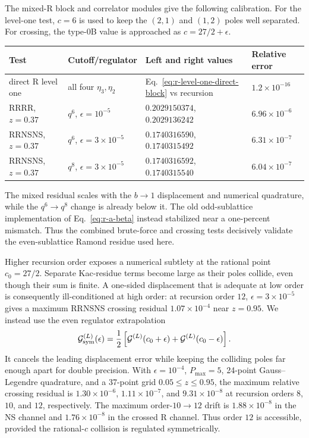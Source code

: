 \documentclass[11pt]{article}
\begin{document}
The mixed-R block and correlator modules give the following calibration.
For the level-one test, $c=6$ is used to keep the $(2,1)$ and $(1,2)$ poles
well separated.  For crossing, the type-0B value is approached as
$c=27/2+\epsilon$.
\begin{center}
\begin{tabular}{@{}llll@{}}
\toprule
Test & Cutoff/regulator & Left and right values & Relative error\\
\midrule
direct R level one
 & all four $\eta_3,\eta_2$
 & Eq.~\eqref{eq:r-level-one-direct-block} vs recursion
 & $1.2\times10^{-16}$\\
RRRR, $z=0.37$
 & $q^6$, $\epsilon=10^{-5}$
 & $0.2029150374$, $0.2029136242$
 & $6.96\times10^{-6}$\\
RRNSNS, $z=0.37$
 & $q^6$, $\epsilon=3\times10^{-5}$
 & $0.1740316590$, $0.1740315492$
 & $6.31\times10^{-7}$\\
RRNSNS, $z=0.37$
 & $q^8$, $\epsilon=3\times10^{-5}$
 & $0.1740316592$, $0.1740315540$
 & $6.04\times10^{-7}$\\
\bottomrule
\end{tabular}
\end{center}
The mixed residual scales with the $b\to1$ displacement and numerical
quadrature, while the $q^6\to q^8$ change is already below it.  The old
odd-sublattice implementation of Eq.~\eqref{eq:r-a-beta} instead stabilized
near a one-percent mismatch.  Thus the combined brute-force and crossing
tests decisively validate the even-sublattice Ramond residue used here.

Higher recursion order exposes a numerical subtlety at the rational point
$c_0=27/2$.  Separate Kac-residue terms become large as their poles collide,
even though their sum is finite.  A one-sided displacement that is adequate
at low order is consequently ill-conditioned at high order: at recursion
order $12$, $\epsilon=3\times10^{-5}$ gives a maximum RRNSNS crossing
residual $1.07\times10^{-4}$ near $z=0.95$.  We instead use the even
regulator extrapolation
\begin{equation}
 \mathcal G_{\rm sym}^{(L)}(\epsilon)
 =\frac12\left[
 \mathcal G^{(L)}(c_0+\epsilon)
 +\mathcal G^{(L)}(c_0-\epsilon)\right].
 \label{eq:symmetric-c-regulator}
\end{equation}
It cancels the leading displacement error while keeping the colliding poles
far enough apart for double precision.  With $\epsilon=10^{-4}$,
$P_{\max}=5$, 24-point Gauss--Legendre quadrature, and a 37-point grid
$0.05\leq z\leq0.95$, the maximum relative crossing residual is
$1.30\times10^{-6}$, $1.11\times10^{-7}$, and $9.31\times10^{-8}$ at
recursion orders $8$, $10$, and $12$, respectively.  The maximum
order-$10\to12$ drift is $1.88\times10^{-8}$ in the NS channel and
$1.76\times10^{-8}$ in the crossed R channel.  Thus order $12$ is accessible,
provided the rational-$c$ collision is regulated symmetrically.
\end{document}
